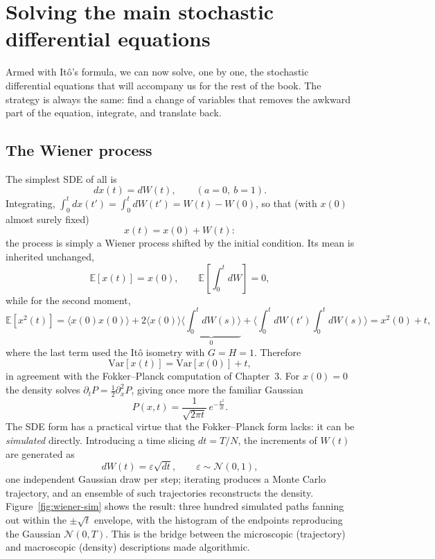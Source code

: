 \section{Solving the main stochastic differential equations}

Armed with It\^o's formula, we can now solve, one by one, the stochastic differential equations that will accompany us for the rest of the book.
The strategy is always the same: find a change of variables that removes the awkward part of the equation, integrate, and translate back.

\subsection{The Wiener process}

The simplest SDE of all is
\begin{equation}
dx(t) = dW(t),\qquad (a=0,\ b=1).
\end{equation}
Integrating, $\int_0^t dx(t') = \int_0^t dW(t') = W(t)-W(0)$, so that (with $x(0)$ almost surely fixed)
\begin{equation}
x(t) = x(0) + W(t):
\end{equation}
the process is simply a Wiener process shifted by the initial condition.
Its mean is inherited unchanged,
\begin{equation}
\mathbb{E}[x(t)] = x(0),\qquad \mathbb{E}\!\left[\int_0^t dW\right]=0,
\end{equation}
while for the second moment,
\begin{equation}
\mathbb{E}[x^2(t)] = \langle x(0)x(0)\rangle + 2\langle x(0)\rangle\underbrace{\Big\langle\!\int_0^t dW(s)\Big\rangle}_{0} + \Big\langle\!\int_0^t dW(t')\!\int_0^t dW(s)\Big\rangle = x^2(0) + t,
\end{equation}
where the last term used the It\^o isometry with $G=H=1$.
Therefore
\begin{equation}
\mathrm{Var}[x(t)] = \mathrm{Var}[x(0)] + t,
\end{equation}
in agreement with the Fokker--Planck computation of Chapter~3.
For $x(0)=0$ the density solves $\partial_t P = \tfrac{1}{2}\partial^2_x P$, giving once more the familiar Gaussian
\begin{equation}
P(x,t) = \frac{1}{\sqrt{2\pi t}}\,e^{-\frac{x^2}{2t}}.
\end{equation}
The SDE form has a practical virtue that the Fokker--Planck form lacks: it can be \emph{simulated} directly.
Introducing a time slicing $dt=T/N$, the increments of $W(t)$ are generated as
\begin{equation}
dW(t) = \varepsilon\sqrt{dt},\qquad \varepsilon\sim\mathcal{N}(0,1),
\end{equation}
one independent Gaussian draw per step; iterating produces a Monte Carlo trajectory, and an ensemble of such trajectories reconstructs the density.
Figure~\ref{fig:wiener-sim} shows the result: three hundred simulated paths fanning out within the $\pm\sqrt{t}$ envelope, with the histogram of the endpoints reproducing the Gaussian $\mathcal{N}(0,T)$.
This is the bridge between the microscopic (trajectory) and macroscopic (density) descriptions made algorithmic.

